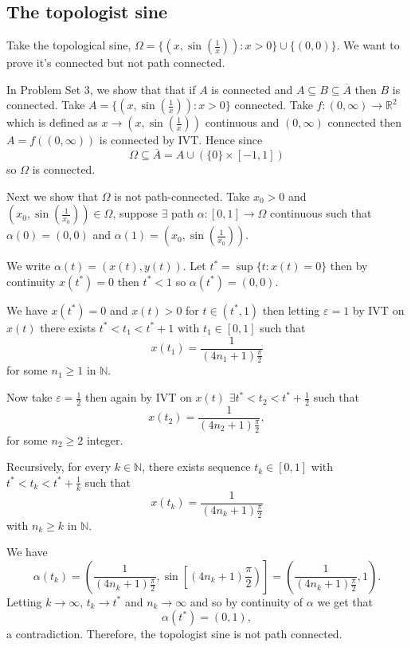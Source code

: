 \documentclass[11pt,openany]{book}
\theoremstyle{plain}
\theoremstyle{definition}
\theoremstyle{remark}
\newcommand{\R}{\mathbb{R}}
\newcommand{\eps}{\varepsilon}
\newcommand{\Om}{\Omega}
\begin{document}
\subsection{The topologist sine}
    Take the topological sine, $\Om = \{ (x, \sin(\frac{1}{x})): x > 0\} \cup \{(0,0)\}$. We want to prove it's connected but not path connected.
    
    In Problem Set 3, we show that that if $A$ is connected and $A \subseteq B \subseteq \overline{A}$ then $B$ is connected. 
    Take 
    $A = \{(x, \sin(\frac{1}{x})): x > 0\}$ connected. Take $f:(0,\infty) \to \R^2$ which is defined as $x \to (x, \sin(\frac{1}{x}))$ continuous and $(0,\infty)$ connected then $A = f((0,\infty))$ is connected by IVT. Hence since $$\Omega\subseteq\overline{A} = A \cup (\{0\} \times [-1,1])$$ so $\Om $ is connected.
    
    
    Next we show that $\Omega$ is not path-connected. Take $x_0 > 0$ and $(x_0, \sin(\frac{1}{x_0})) \in \Om$, suppose $\exists$ path $\alpha: [0,1] \to \Om$ continuous such that $\alpha(0) = (0,0)$ and $\alpha(1) = (x_0, \sin(\frac{1}{x_0}))$. 
    
    We write $\alpha(t) = (x(t),y(t))$. Let $t^* = \sup\{ t: x(t) = 0\}$ then by continuity $x(t^*) = 0$ then $t^* <1$ so $\alpha(t^*) = (0, 0)$. 

    We have $x(t^*)=0$ and $x(t)>0$ for $t\in (t^*,1)$ then letting $\eps = 1$ by IVT on $x(t)$ there exists $t^*<t_1 < t^*+1 \text{ with } t_1\in [0,1]$ such that \[x(t_1) = \frac{1}{(4n_1+1)\frac{\pi}{2}}\]
    for some $n_1\geq 1$ in $\mathbb N$.
    
    Now take $\eps = \frac{1}{2}$ then again by IVT on $x(t)$ $\exists t^* < t_2 < t^* + \frac{1}{2}$ such that \[x(t_2) = \frac{1}{(4n_2+1)\frac{\pi}{2}},\]
    for some $n_2\geq 2$ integer.
    
    Recursively, for every $k\in \mathbb N$, there exists sequence $t_k \in [0,1]$ with $t^* < t_k < t^*+\frac{1}{k}$ such that \[x(t_k) = \frac{1}{(4n_k+1)\frac{\pi}{2}}\] 
    with $n_k\geq k$ in $\mathbb N$.
    
    We have \[\alpha(t_k) = \left(\frac{1}{(4n_k+1)\frac{\pi}{2}}, \sin\left[(4n_k+1)\frac{\pi}{2}\right)\right]=\left(\frac{1}{(4n_k+1)\frac{\pi}{2}},1\right).\] 
    Letting $k\to \infty$, $t_k\to t^*$ and $n_k\to \infty$ and so by continuity of $\alpha$ we get that $$\alpha(t^*) = (0,1),$$ a contradiction. Therefore, the topologist sine is not path connected.
\end{document}
